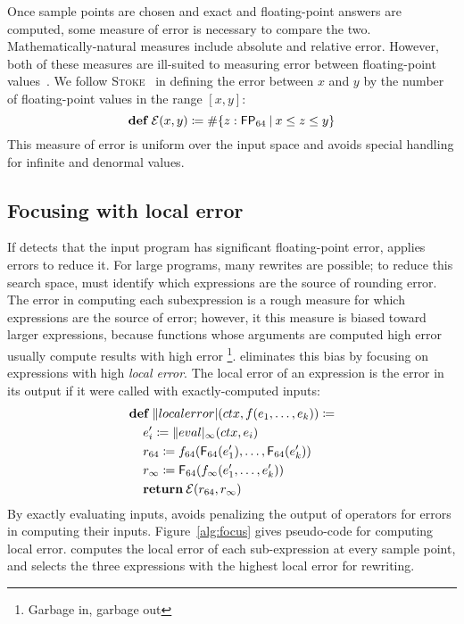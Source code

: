 \documentclass[paper.tex]{subfiles}
\begin{document}
Once sample points are chosen and exact and floating-point answers
  are computed, some measure of error is necessary to compare the two.
Mathematically-natural measures include absolute and relative error.
However, both of these measures are ill-suited to measuring error
  between floating-point values~\cite{pldi14-stoke}.
We follow \textsc{Stoke}~\cite{pldi14-stoke}
  in defining the error between $x$ and $y$ by
  the number of floating-point values in the range $[x, y]$:
\[
\!def!\:\Err(x, y) \ceq \#\{ z : \FP_{64}\:|\:x \le z \le y \}
\]
This measure of error is uniform over the input space
  and avoids special handling for infinite and denormal values.

\subsection{Focusing with local error}

If \casio detects that the input program
  has significant floating-point error,
  \casio applies errors to reduce it.
For large programs, many rewrites are possible;
  to reduce this search space,
  \casio must identify which expressions are the source of rounding error.
The error in computing each subexpression
  is a rough measure for which expressions are the source of error;
  however, it this measure is biased toward larger expressions,
  because functions whose arguments are computed high error
  usually compute results with high error%
  \footnote{Garbage in, garbage out}.
\casio eliminates this bias by focusing on expressions
  with high \emph{local error}.
The local error of an expression
  is the error in its output if it were called with exactly-computed inputs:
\begin{align*}
  &\!def!\:\|localerror|(ctx, f(e_1, \dotsc, e_k)) \ceq \\
  &\> e_i' \ceq \|eval|_\infty(ctx, e_i) \\
  &\> r_{64} \ceq f_{64}(\F_{64}(e_1'), \dotsc, \F_{64}(e_k')) \\
  &\> r_\infty \ceq \F_{64}(f_\infty(e_1', \dotsc, e_k')) \\
  &\> \!return!\:\Err(r_{64}, r_\infty)
\end{align*}
By exactly evaluating inputs,
  \casio avoids penalizing the output of operators
  for errors in computing their inputs.
Figure~\ref{alg:focus} gives pseudo-code for computing local error.
\casio computes the local error of each sub-expression at every sample point,
  and selects the three expressions with the highest local error
  for rewriting.
\end{document}
